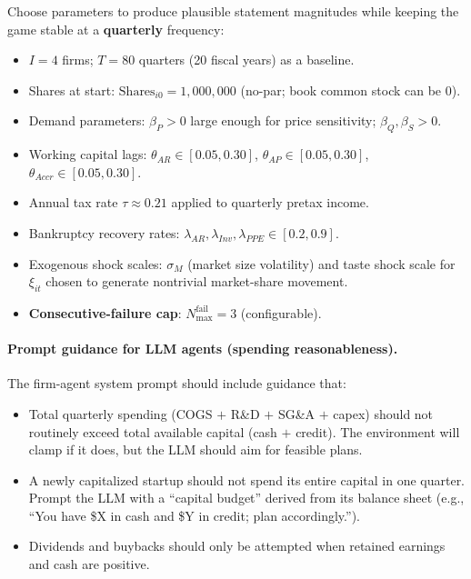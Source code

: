 \documentclass[11pt]{article}
\begin{document}
Choose parameters to produce plausible statement magnitudes while keeping the game stable at a \textbf{quarterly} frequency:
\begin{itemize}[leftmargin=*]
    \item $I=4$ firms; $T=80$ quarters (20 fiscal years) as a baseline.
    \item Shares at start: $\text{Shares}_{i0}=1{,}000{,}000$ (no-par; book common stock can be $0$).
    \item Demand parameters: $\beta_P>0$ large enough for price sensitivity; $\beta_Q,\beta_S>0$.
    \item Working capital lags: $\theta_{AR}\in[0.05,0.30]$, $\theta_{AP}\in[0.05,0.30]$, $\theta_{Accr}\in[0.05,0.30]$.
    \item Annual tax rate $\tau\approx 0.21$ applied to quarterly pretax income.
    \item Bankruptcy recovery rates: $\lambda_{AR},\lambda_{Inv},\lambda_{PPE}\in[0.2,0.9]$.
    \item Exogenous shock scales: $\sigma_M$ (market size volatility) and taste shock scale for $\xi_{it}$ chosen to generate nontrivial market-share movement.
    \item \textbf{Consecutive-failure cap}: $N_{\max}^{\text{fail}}=3$ (configurable).
\end{itemize}

\paragraph{Prompt guidance for LLM agents (spending reasonableness).}
The firm-agent system prompt should include guidance that:
\begin{itemize}[leftmargin=*]
    \item Total quarterly spending (COGS $+$ R\&D $+$ SG\&A $+$ capex) should not routinely exceed total available capital (cash $+$ credit). The environment will clamp if it does, but the LLM should aim for feasible plans.
    \item A newly capitalized startup should not spend its entire capital in one quarter. Prompt the LLM with a ``capital budget'' derived from its balance sheet (e.g., ``You have \$X in cash and \$Y in credit; plan accordingly.'').
    \item Dividends and buybacks should only be attempted when retained earnings and cash are positive.
\end{itemize}
\end{document}
